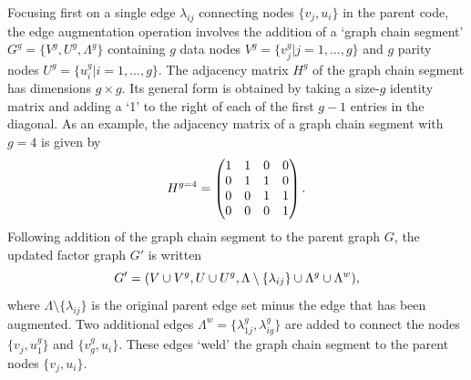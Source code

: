 \documentclass[%
 reprint,
superscriptaddress,
nofootinbib,
 amsmath,amssymb,
secnumarabic
]{revtex4-1}
\begin{document}
Focusing first on a single edge $\lambda_{ij}$ connecting nodes $\{v_j,u_i\}$ in the parent code, the edge augmentation operation involves the addition of a `graph chain segment' $G^{ g}=\{V^{g},U^{g},\Lambda^g\}$ containing $g$ data nodes $V^g=\{ v^g_j|j=1,...,g \}$ and $g$ parity nodes $U^g=\{ u^g_i|i=1,...,g \}$. The adjacency matrix $H^g$ of the graph chain segment has dimensions $g\times g$. Its general form is obtained by taking a size-$g$ identity matrix and adding a `1' to the right of each of the first $g-1$ entries in the diagonal. As an example, the adjacency matrix of a graph chain segment with $g=4$ is given by
%
\begin{equation}
H^{g=4} = \left(  \begin{matrix}
1 & 1 & 0 & 0\\
0 & 1 & 1 & 0\\
0 & 0 & 1 & 1\\
0 & 0 & 0 & 1
\end{matrix}  \right)\rm.
\end{equation}
Following addition of the graph chain segment to the parent graph $G$, the updated factor graph $G'$ is written
%
\begin{equation}
G'=(V\cup V^g, U\cup U^g, \Lambda \setminus\{ \lambda_{ij}\} \cup \Lambda^g \cup \Lambda^{w}  )\rm,
\end{equation} 
%
where $\Lambda\setminus \{\lambda_{ij} \}$ is the original parent edge set minus the edge that has been augmented. Two additional edges $\Lambda^w=\{\lambda^g_{1j}, \lambda^g_{ig}\} $ are added to connect the nodes $\{v_j,u^g_1\}$ and $\{v^g_g,u_i\}$. These edges `weld' the graph chain segment to the parent nodes $\{v_j,u_i\}$. 
\end{document}
